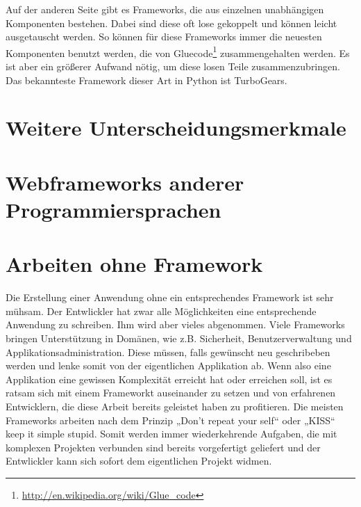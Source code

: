 Auf der anderen Seite gibt es Frameworks, die aus einzelnen
unabhängigen Komponenten bestehen. Dabei sind diese oft lose gekoppelt und
können leicht ausgetauscht werden. So können für diese Frameworks immer die 
neuesten Komponenten benutzt werden, die von
Gluecode\footnote{\url{http://en.wikipedia.org/wiki/Glue_code}} zusammengehalten
werden. Es ist aber ein größerer Aufwand nötig, um diese losen Teile 
zusammenzubringen. Das bekannteste Framework dieser Art in Python ist TurboGears.

\section{Weitere Unterscheidungsmerkmale}

\section{Webframeworks anderer Programmiersprachen }
\section{Arbeiten ohne Framework}
Die Erstellung einer Anwendung ohne ein entsprechendes Framework ist sehr
mühsam. Der Entwlickler hat zwar alle Möglichkeiten eine entsprechende
Anwendung zu schreiben. Ihm wird aber vieles abgenommen. Viele Frameworks
bringen Unterstützung in Domänen, wie z.B. Sicherheit, Benutzerverwaltung und
Applikationsadministration. Diese müssen, falls gewünscht neu geschribeben
werden und lenke somit von der eigentlichen Applikation ab. Wenn also eine
Applikation eine gewissen Komplexität erreicht hat oder erreichen soll, ist es
ratsam sich mit einem Frameworkt auseinander zu setzen und von erfahrenen
Entwicklern, die diese Arbeit bereits geleistet haben zu profitieren. Die
meisten Frameworks arbeiten nach dem Prinzip „Don't repeat your self“ oder
„KISS“ keep it simple stupid. Somit werden immer wiederkehrende Aufgaben, die
mit komplexen Projekten verbunden sind bereits vorgefertigt geliefert und der
Entwlickler kann sich sofort dem eigentlichen Projekt widmen. 



